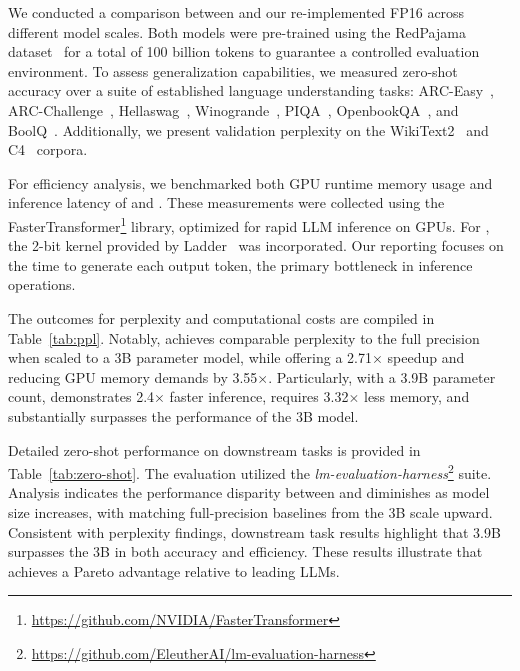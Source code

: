 We conducted a comparison between  and our re-implemented FP16  across different model scales. Both models were pre-trained using the RedPajama dataset~\cite{redpajama} for a total of 100 billion tokens to guarantee a controlled evaluation environment. To assess generalization capabilities, we measured zero-shot accuracy over a suite of established language understanding tasks: ARC-Easy~\cite{arc}, ARC-Challenge~\cite{arc}, Hellaswag~\cite{hellaswag}, Winogrande~\cite{winoGrande}, PIQA~\cite{piqa}, OpenbookQA~\cite{openbookqa}, and BoolQ~\cite{boolq}. Additionally, we present validation perplexity on the WikiText2~\cite{wikitext2} and C4~\cite{c4} corpora.

For efficiency analysis, we benchmarked both GPU runtime memory usage and inference latency of  and . These measurements were collected using the FasterTransformer\footnote{\url{https://github.com/NVIDIA/FasterTransformer}} library, optimized for rapid LLM inference on GPUs. For , the 2-bit kernel provided by Ladder~\cite{ladder} was incorporated. Our reporting focuses on the time to generate each output token, the primary bottleneck in inference operations.

The outcomes for perplexity and computational costs are compiled in Table~\ref{tab:ppl}. Notably,  achieves comparable perplexity to the full precision  when scaled to a 3B parameter model, while offering a 2.71$\times$ speedup and reducing GPU memory demands by 3.55$\times$. Particularly, with a 3.9B parameter count,  demonstrates 2.4$\times$ faster inference, requires 3.32$\times$ less memory, and substantially surpasses the performance of the  3B model.

Detailed zero-shot performance on downstream tasks is provided in Table~\ref{tab:zero-shot}. The evaluation utilized the \emph{lm-evaluation-harness}\footnote{\url{https://github.com/EleutherAI/lm-evaluation-harness}} suite. Analysis indicates the performance disparity between  and  diminishes as model size increases, with  matching full-precision baselines from the 3B scale upward. Consistent with perplexity findings, downstream task results highlight that  3.9B surpasses the 3B  in both accuracy and efficiency. These results illustrate that  achieves a Pareto advantage relative to leading LLMs.

